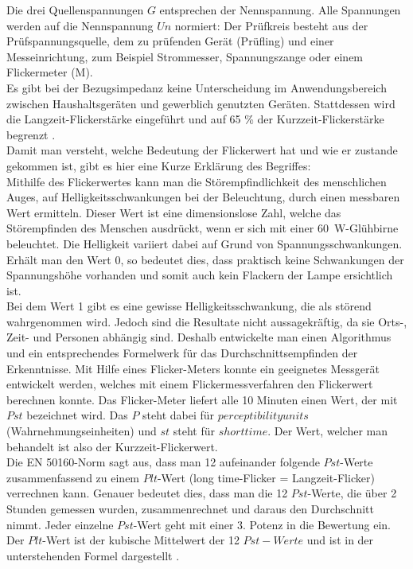 \begin{appendix}
Die drei Quellenspannungen $G$ entsprechen der Nennspannung. Alle Spannungen werden auf die Nennspannung $Un$ normiert: Der Prüfkreis besteht aus der Prüfspannungsquelle, dem zu prüfenden Gerät (Prüfling) und einer Messeinrichtung, zum Beispiel Strommesser, Spannungszange oder einem Flickermeter (M).\\
Es gibt bei der Bezugsimpedanz keine Unterscheidung im Anwendungsbereich zwischen Haushaltsgeräten und gewerblich genutzten Geräten. Stattdessen wird die Langzeit-Flickerstärke eingeführt und auf 65 \% der Kurzzeit-Flickerstärke begrenzt \cite{FlickerNorm}.\\
Damit man versteht, welche Bedeutung der Flickerwert hat und wie er zustande gekommen ist, gibt es hier eine Kurze Erklärung des Begriffes:\\
Mithilfe des Flickerwertes kann man die Störempfindlichkeit des menschlichen Auges, auf Helligkeitsschwankungen bei der Beleuchtung, durch einen messbaren Wert ermitteln. Dieser Wert ist eine dimensionslose Zahl, welche das Störempfinden des Menschen ausdrückt, wenn er sich mit einer \SI{60}{W}-Glühbirne beleuchtet. Die Helligkeit variiert dabei auf Grund von Spannungsschwankungen. Erhält man den Wert 0, so bedeutet dies, dass praktisch keine Schwankungen der Spannungshöhe vorhanden und somit auch kein Flackern der Lampe ersichtlich ist.\\
Bei dem Wert 1 gibt es eine gewisse Helligkeitsschwankung, die als störend wahrgenommen wird. Jedoch sind die Resultate nicht aussagekräftig, da sie Orts-, Zeit- und Personen abhängig sind. Deshalb entwickelte man einen Algorithmus und ein entsprechendes Formelwerk für das Durchschnittsempfinden der Erkenntnisse. Mit Hilfe eines Flicker-Meters konnte ein geeignetes Messgerät entwickelt werden, welches mit einem Flickermessverfahren den Flickerwert berechnen konnte. Das Flicker-Meter liefert alle 10 Minuten einen Wert, der mit $Pst$ bezeichnet wird. Das $P$ steht dabei für $perceptibility units$ (Wahrnehmungseinheiten) und $st$ steht für $short time$. Der Wert, welcher man behandelt ist also der Kurzzeit-Flickerwert.\\
Die EN 50160-Norm sagt aus, dass man 12 aufeinander folgende $Pst$-Werte zusammenfassend zu einem $Plt$-Wert (long time-Flicker = Langzeit-Flicker) verrechnen kann. Genauer bedeutet dies, dass man die 12 $Pst$-Werte, die über 2 Stunden gemessen wurden, zusammenrechnet und daraus den Durchschnitt nimmt. Jeder einzelne $Pst$-Wert geht mit einer 3. Potenz in die Bewertung ein. Der $Plt$-Wert ist der kubische Mittelwert der 12 $Pst-Werte$ und ist in der unterstehenden Formel dargestellt \cite{Spannungsqualitaet}.


\end{appendix}
